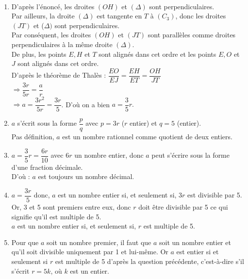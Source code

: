 \begin{corrige}
\ \\ [-5mm]
   \begin{enumerate}
      \item D'après l'énoncé, les droites $(OH)$ et $(\Delta)$ sont perpendiculaires. \\
         Par ailleurs, la droite $(\Delta)$ est tangente en $T$ à $(C_3)$, donc les droites $(JT)$ et ($\Delta)$ sont perpendiculaires. \\
         Par conséquent, les droites $(OH)$ et $(JT)$ sont parallèles comme droites perpendiculaires à la même droite $(\Delta)$. \\
         De plus, les points $E, H$ et $T$ sont alignés dans cet ordre et les points $E, O $ et $J$ sont alignés dans cet ordre. \\
         D'après le théorème de Thalès : $\dfrac{EO}{EJ} =\dfrac{EH}{ET} =\dfrac{OH}{JT}$ \\ [1mm]
         \hspace*{4.2cm} $\Rightarrow \dfrac{3r}{5r} =\dfrac{a}{r}$ \\ [1mm]
         \hspace*{4.3cm} $\Rightarrow a =\dfrac{3r^2}{5r} =\dfrac{3r}{5}$. \quad D'où on a bien {\blue $a =\dfrac35r$.}
      \item $a$ s'écrit sous la forme $\dfrac{p}{q}$ avec $p =3r$ ($r$ entier) et $q =5$ (entier). \\ [1mm]
         Pas définition, {\blue $a$ est un nombre rationnel comme quotient de deux entiers}.
      \item $a =\dfrac35r =\dfrac{6r}{10}$ avec $6r$ un nombre entier, donc $a$ peut s'écrire sous la forme d'une fraction décimale. \\ [1mm]
         D'où : {\blue $a$ est toujours un nombre décimal}.
      \item $a =\dfrac{3r}{5}$ donc, $a$ est un nombre entier si, et seulement si, $3r$ est divisible par 5. \\ [1mm]
         Or, 3 et 5 sont premiers entre eux, donc $r$ doit être divisible par 5 ce qui signifie qu'il est multiple de 5. \\
         {\blue $a$ est un nombre entier si, et seulement si, $r$ est  multiple de 5}.
      \item Pour que $a$ soit un nombre premier, il faut que $a$ soit un nombre entier et qu'il soit divisible uniquement par 1 et lui-même. Or $a$ est entier si et seulement si $r$ est multiple de 5 d'après la question précédente, c'est-à-dire s'il s'écrit $r = 5k$, où $k$ est un entier. \\

\end{enumerate}
\end{corrige}
